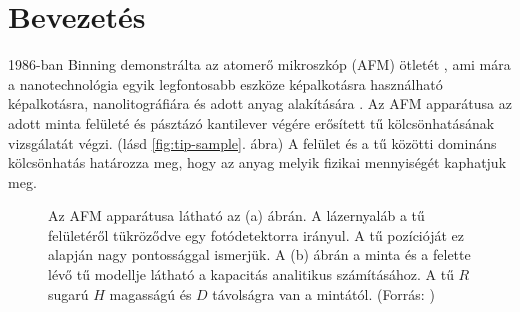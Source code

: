 \chapter{Bevezetés}
	1986-ban Binning demonstrálta az atomerő mikroszkóp (AFM) ötletét \cite{Binnig1986}, ami mára 
	a nanotechnológia egyik legfontosabb eszköze képalkotásra használható képalkotásra, nanolitográfiára és 
	adott anyag alakítására \cite{Vasic2013}.
	Az AFM apparátusa az adott minta felületé és pásztázó kantilever végére erősített tű 
	kölcsönhatásának vizsgálatát végzi. (lásd \ref{fig:tip-sample}. ábra)
	A felület és a tű közötti domináns kölcsönhatás határozza meg, hogy az anyag melyik fizikai
	mennyiségét kaphatjuk meg.
	\begin{figure}[H]
		\centering
		\hfil
		\caption{Az AFM apparátusa látható az (a) ábrán. A lázernyaláb
		a tű felületéről tükröződve egy fotódetektorra irányul. A tű pozícióját ez alapján nagy pontossággal ismerjük. A
		(b) ábrán a minta és a felette lévő tű modellje látható a kapacitás analitikus számításához.
		A tű $R$ sugarú $H$ magasságú és $D$ távolságra van a mintától. (Forrás: \cite{Butt20051})}
		\label{fig:fig_sim}
	\end{figure}
